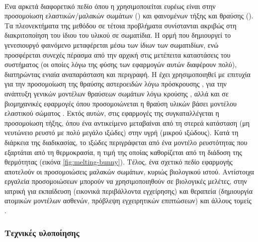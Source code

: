 \paragraph{} Ένα αρκετά διαφορετικό πεδίο όπου η  χρησιμοποιείται ευρέως είναι
στην προσομοίωση ελαστικών/μαλακών σωμάτων () και φαινομένων
τήξης και θραύσης (). Τα πλεονεκτήματα της μεθόδου σε τέτοια προβλήματα
συνίστανται ακριβώς στη διακριτοποίηση του ίδιου του υλικού σε σωματίδια. Η ορμή που
δημιουργεί το γενεσιουργό φαινόμενο μεταφέρεται μέσω των ίδιων των σωματιδίων, ενώ
προσφέρεται συνεχές πέρασμα από την αρχική στις μετέπειτα καταστάσεις του συστήματος (οι
οποίες λόγω της φύσης των εφαρμογών αυτών διαφέρουν πολύ), διατηρώντας ενιαία αναπαράσταση
και περιγραφή. Η  έχει χρησιμοποιηθεί με επιτυχία για την προσομοίωση της θραύσης
αστεροειδών λόγω πρόσκρουσης \cite{Benz199498}, για την ανάπτυξη γενικών μοντέλων θραύσεων
σωμάτων λόγω κρούσης \cite{Benz1995253}, αλλά και σε βιομηχανικές εφαρμογές όπου
προσομοιώνεται η θραύση υλικών βάσει μοντέλου ελαστικού σώματος \cite{Das201047}. Εκτός
αυτών, στις εφαρμογές της  συγκαταλλέγεται η προσομοίωση τήξης, όπου ένα
αντικείμενο μεταβαίναι από τη στερεά κατάσταση (μη νευτώνειο ρευστό με πολύ μεγάλο ιξώδες)
στην υγρή (μικρού ιξώδους). Κατά τη διάρκεια της διαδικασίας, το ιξώδες περιγράφεται από
ένα μοντέλο ρευστότητας που εξαρτάται από τη θερμοκρασία, η τιμή της οποίας καθορίζεται
από τη διάδοση της θερμότητας \cite{paiva2006particle} (εικόνα
\ref{fig:melting-bunny}). Τέλος, ένα σχετικό πεδίο εφαρμογής αποτελούν οι προσομοιώσεις
μαλακών σωμάτων, κυριώς βιολογικού ιστού. Αντίστοιχα εργαλεία προσομοιώσεων μπορούν να
χρησιμοποιηθούν σε βιολογικές μελέτες, στην ιατρική για εκπαίδευση (εικονικά περιβάλλοντα
εγχείρησης) και θεραπεία (δημιουργία ατομικών μοντέλων ασθενών, πρόβλεψη εγχειρητικών
επιπτώσεων) και άλλους τομείς \cite{Hieber20089195}.

\subsubsection{Τεχνικές υλοποίησης}


